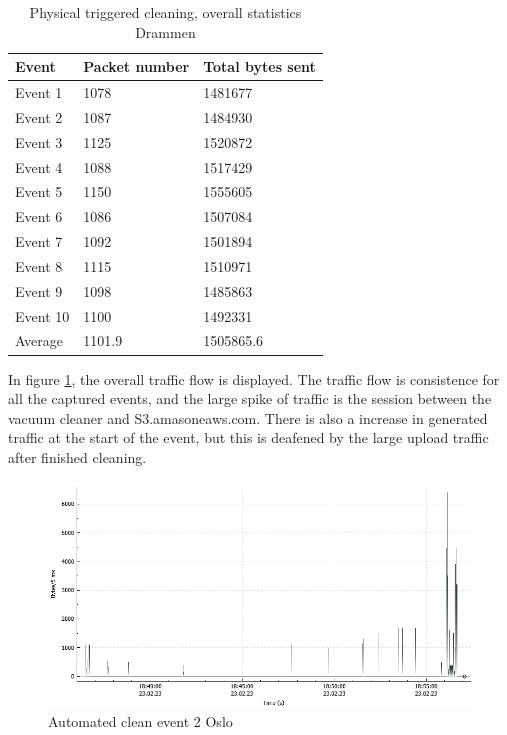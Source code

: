 \begin{table}[H]
\centering
\caption{Physical triggered cleaning, overall statistics Drammen}
\label{tab:PCoverallDRA}
\begin{tabular}{|l|l|l|}
\hline
\textbf{Event} & \textbf{Packet number} & \textbf{Total bytes sent} \\ \hline
Event 1        & 1078                   & 1481677                   \\ \hline
Event 2        & 1087                   & 1484930                   \\ \hline
Event 3        & 1125                   & 1520872                   \\ \hline
Event 4        & 1088                   & 1517429                   \\ \hline
Event 5        & 1150                   & 1555605                   \\ \hline
Event 6        & 1086                   & 1507084                   \\ \hline
Event 7        & 1092                   & 1501894                   \\ \hline
Event 8        & 1115                   & 1510971                   \\ \hline
Event 9        & 1098                   & 1485863                   \\ \hline
Event 10       & 1100                   & 1492331                   \\ \hline
Average        & 1101.9                 & 1505865.6                 \\ \hline
\end{tabular}
\end{table}

In figure \ref{fig:Pc-graph}, the overall traffic flow is displayed. The traffic flow is consistence for all the captured events, and the large spike of traffic is the session between the vacuum cleaner and S3.amasoneaws.com. There is also a increase in generated traffic at the start of the event, but this is 
deafened by the large upload traffic after finished cleaning.
\begin{figure}[H]
    \centering
    \includegraphics[width=\textwidth]{figures/PC-graph.png}
    \caption{Automated clean event 2 Oslo}
    \label{fig:Pc-graph}
\end{figure}


